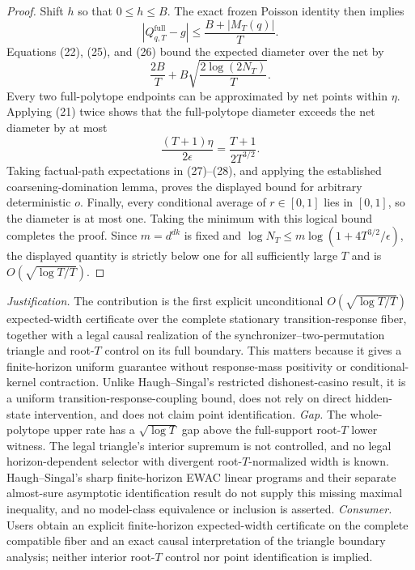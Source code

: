 \documentclass{article}
\begin{document}
\begin{proof}
Shift \(h\) so that \(0\leq h\leq B\).  The exact frozen Poisson identity then implies
\[
 \left|Q^{\mathrm{full}}_{q,T}-g\right|
 \leq\frac{B+|M_T(q)|}{T}.
 \tag{26}
\]
Equations (22), (25), and (26) bound the expected diameter over the net by
\[
 \frac{2B}{T}+B\sqrt{\frac{2\log(2N_T)}T}.
 \tag{27}
\]
Every two full-polytope endpoints can be approximated by net points within \(\eta\).  Applying (21) twice shows that the full-polytope diameter exceeds the net diameter by at most
\[
 \frac{(T+1)\eta}{2\epsilon}=\frac{T+1}{2T^{3/2}}.
 \tag{28}
\]
Taking factual-path expectations in (27)--(28), and applying the established coarsening-domination lemma, proves the displayed bound for arbitrary deterministic \(o\).  Finally, every conditional average of \(r\in[0,1]\) lies in \([0,1]\), so the diameter is at most one.  Taking the minimum with this logical bound completes the proof.  Since \(m=d^{dk}\) is fixed and \(\log N_T\leq m\log(1+4T^{3/2}/\epsilon)\), the displayed quantity is strictly below one for all sufficiently large \(T\) and is \(O(\sqrt{\log T/T})\).
\end{proof}
\par\smallskip\noindent \textit{Justification.} The contribution is the first explicit unconditional \(O(\sqrt{\log T/T})\) expected-width certificate over the complete stationary transition-response fiber, together with a legal causal realization of the synchronizer--two-permutation triangle and root-\(T\) control on its full boundary. This matters because it gives a finite-horizon uniform guarantee without response-mass positivity or conditional-kernel contraction. Unlike Haugh--Singal's restricted dishonest-casino result, it is a uniform transition-response-coupling bound, does not rely on direct hidden-state intervention, and does not claim point identification. \textit{Gap.} The whole-polytope upper rate has a \(\sqrt{\log T}\) gap above the full-support root-\(T\) lower witness. The legal triangle's interior supremum is not controlled, and no legal horizon-dependent selector with divergent root-\(T\)-normalized width is known. Haugh--Singal's sharp finite-horizon EWAC linear programs and their separate almost-sure asymptotic identification result do not supply this missing maximal inequality, and no model-class equivalence or inclusion is asserted. \textit{Consumer.} Users obtain an explicit finite-horizon expected-width certificate on the complete compatible fiber and an exact causal interpretation of the triangle boundary analysis; neither interior root-\(T\) control nor point identification is implied.
\end{document}
